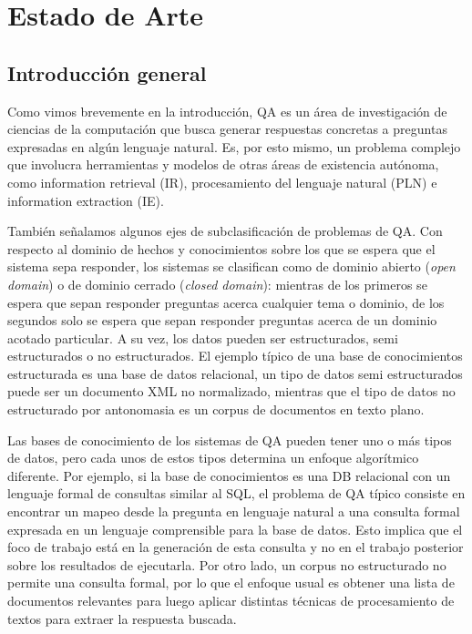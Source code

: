 \chapter{Estado de Arte}
\label{chap:estado-de-arte}
\section{Introducción general}
\label{sec:intro-general-qa}
Como vimos brevemente en la introducción, QA es un área de investigación de ciencias de la computación que busca generar respuestas concretas a preguntas expresadas en algún lenguaje natural. Es, por esto mismo, un problema complejo que involucra herramientas y modelos de otras áreas de existencia autónoma, como information retrieval (IR), procesamiento del lenguaje natural (PLN) e information extraction (IE).

También señalamos algunos ejes de subclasificación de problemas de QA. Con respecto al dominio de hechos y conocimientos sobre los que se espera que el sistema sepa responder, los sistemas se clasifican como de dominio abierto (\textit{open domain}) o de dominio cerrado (\textit{closed domain}): mientras de los primeros se espera que sepan responder preguntas acerca cualquier tema o dominio, de los segundos solo se espera que sepan responder preguntas acerca de un dominio acotado particular. A su vez, los datos pueden ser estructurados, semi estructurados o no estructurados. El ejemplo típico de una base de conocimientos estructurada es una base de datos relacional, un tipo de datos semi estructurados puede ser un documento XML no normalizado, mientras que el tipo de datos no estructurado por antonomasia es un corpus de documentos en texto plano.

Las bases de conocimiento de los sistemas de QA pueden tener uno o más tipos de datos, pero cada unos de estos tipos determina un enfoque algorítmico diferente. Por ejemplo, si la base de conocimientos es una DB relacional con un lenguaje formal de consultas similar al SQL, el problema de QA típico consiste en encontrar un mapeo desde la pregunta en lenguaje natural a una consulta formal expresada en un lenguaje comprensible para la base de datos. Esto implica que el foco de trabajo está en la generación de esta consulta y no en el trabajo posterior sobre los resultados de ejecutarla. Por otro lado, un corpus no estructurado no permite una consulta formal, por lo que el enfoque usual es obtener una lista de documentos relevantes para luego aplicar distintas técnicas de procesamiento de textos para extraer la respuesta buscada.

